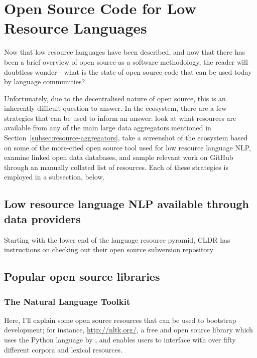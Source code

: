 \section{Open Source Code for Low Resource Languages}
\label{sec:endlangcode}

Now that low resource languages have been described, and now that there has been a brief overview of open source as a software methodology, the reader will doubtless wonder - what is the state of open source code that can be used today by language communities? 


Unfortunately, due to the decentralised nature of open source, this is an inherently difficult question to answer. In the ecosystem, there are a few strategies that can be used to inform an answer: look at what resources are available from any of the main large data aggregators mentioned in Section~\ref{subsec:resource-aggregators}, take a screenshot of the ecosystem based on some of the more-cited open source tool used for low resource language NLP, examine linked open data databases, and sample relevant work on GitHub through an manually collated list of resources. Each of these strategies is employed in a subsection, below.

\subsection{Low resource language NLP available through data providers}
\label{subsec:lrl-nlp-through-providers}

Starting with the lower end of the language resource pyramid, CLDR has instructions on checking out their open source subversion repository 


\subsection{Popular open source libraries}
\label{subsec:popular-open-source-libraries}

\subsubsection{The Natural Language Toolkit}
Here, I'll explain some open source resources that can be used to bootstrap development; for instance, \href{NLTK (Natural Language Toolkit)}{http://nltk.org/}, a free and open source library which uses the Python language by \citet{bird2006nltk}, and enables users to interface with over fifty different corpora and lexical resources.

